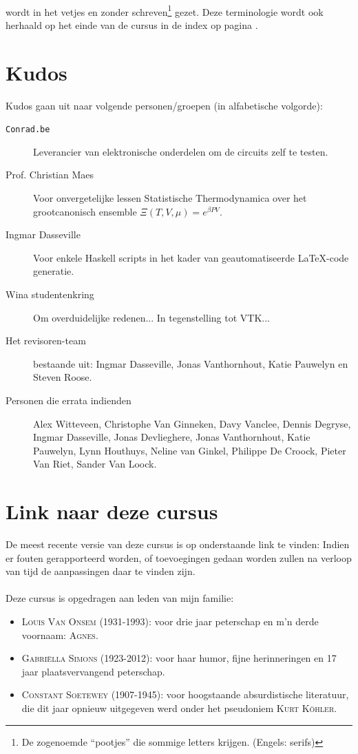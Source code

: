 \documentclass[a4paper,10pt,titlepage]{book}
\begin{document}
\begin{it}
\paragraph{}
 wordt in het vetjes en zonder schreven\footnote{De zogenoemde ``pootjes'' die sommige letters krijgen. (Engels: serifs)} gezet. Deze terminologie wordt ook herhaald op het einde van de cursus in de index op pagina \pageref{idx}.
\section*{Kudos}
Kudos gaan uit naar volgende personen/groepen (in alfabetische volgorde):
\begin{description}
 \item[\texttt{Conrad.be}] Leverancier van elektronische onderdelen om de circuits zelf te testen.
 \item[Prof. Christian Maes] Voor onvergetelijke lessen Statistische Thermodynamica over het grootcanonisch ensemble $\Xi\left(T,V,\mu\right)=e^{\beta PV}$.
 \item[Ingmar Dasseville] Voor enkele Haskell scripts in het kader van geautomatiseerde \LaTeX-code generatie.
 \item[Wina studentenkring] Om overduidelijke redenen... In tegenstelling tot VTK...
 \item[Het revisoren-team] bestaande uit: Ingmar Dasseville, Jonas Vanthornhout, Katie Pauwelyn en Steven Roose.
 \item[Personen die errata indienden] Alex Witteveen, Christophe Van Ginneken, Davy Vanclee, Dennis Degryse, Ingmar Dasseville, Jonas Devlieghere, Jonas Vanthornhout, Katie Pauwelyn, Lynn Houthuys, Neline van Ginkel, Philippe De Croock, Pieter Van Riet, Sander Van Loock.
\end{description}
\section*{Link naar deze cursus}
De meest recente versie van deze cursus is op onderstaande link te vinden:
Indien er fouten gerapporteerd worden, of toevoegingen gedaan worden zullen na verloop van tijd de aanpassingen daar te vinden zijn.
\paragraph{}Deze cursus is opgedragen aan leden van mijn familie:
\begin{itemize}
 \item \textsc{Louis Van Onsem (1931-1993)}: voor drie jaar peterschap en m'n derde voornaam: \textsc{Agnes}.%
 \item \textsc{Gabri\"ella Simons (1923-2012)}: voor haar humor, fijne herinneringen en 17 jaar plaatsvervangend peterschap.
 \item \textsc{Constant Soetewey (1907-1945)}: voor hoogstaande absurdistische literatuur, die dit jaar opnieuw uitgegeven werd\cite{Kohler} onder het pseudoniem \textsc{Kurt K\"ohler}.
\end{itemize}
\end{it}
\end{document}
